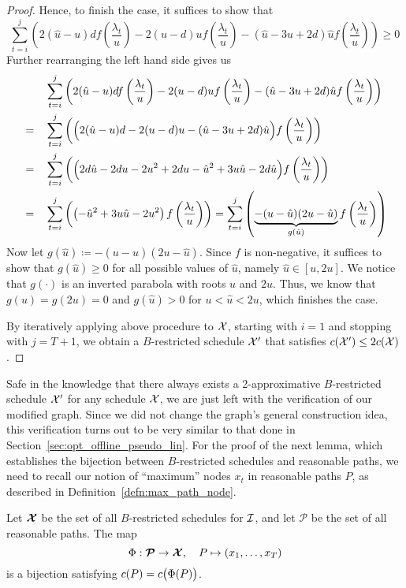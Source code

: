 \begin{proof}
Hence, to finish the case, it suffices to show that
\begin{equation*}
	\sum\limits_{t=i}^j\left(2(\hat{u}-u)df\left(\frac{\lambda_t}{u}\right)-2(u-d)uf\left(\frac{\lambda_t}{u}\right)-(\hat{u}-3u+2d)\hat{u}f\left(\frac{\lambda_t}{u}\right)\right)\ge 0
\end{equation*}
Further rearranging the left hand side gives us
\begin{align*}
	&&&\sum\limits_{t=i}^j\left(2(\hat{u}-u)df\left(\frac{\lambda_t}{u}\right)-2(u-d)uf\left(\frac{\lambda_t}{u}\right)-(\hat{u}-3u+2d)\hat{u}f\left(\frac{\lambda_t}{u}\right)\right)\\
	&=&&\sum\limits_{t=i}^j\left(\Bigl(2(\hat{u}-u)d-2(u-d)u-(\hat{u}-3u+2d)\hat{u}\Bigr)f\left(\frac{\lambda_t}{u}\right)\right)\\
	&=&&\sum\limits_{t=i}^j\left(\Bigl(2d\hat{u}-2du-2u^2+2du-\hat{u}^2+3u\hat{u}-2d\hat{u}\Bigr)f\left(\frac{\lambda_t}{u}\right)\right)\\
	&=&&\sum\limits_{t=i}^j\left(\left(-\hat{u}^2+3u\hat{u}-2u^2\right)f\left(\frac{\lambda_t}{u}\right)\right)=\sum\limits_{t=i}^j\left(\underbrace{-(u-\hat{u})(2u-\hat{u})}_{g(\hat{u})}f\left(\frac{\lambda_t}{u}\right)\right) 
\end{align*}
Now let $g(\hat{u})\coloneqq-(u-\hat{u})(2u-\hat{u})$. Since $f$ is non-negative, it suffices to show that $g(\hat{u})\ge0$ for all possible values of $\hat{u}$, namely $\hat{u}\in[u,2u]$. We notice that $g(\cdot)$ is an inverted parabola with roots $u$ and $2u$. Thus, we know that $g(u)=g(2u)=0$ and $g(\hat{u})>0$ for $u<\hat{u}<2u$, which finishes the case.

By iteratively applying above procedure to $\mathcal{X}$, starting with $i=1$ and stopping with $j=T+1$, we obtain a $B$-restricted schedule $\mathcal{X}'$ that satisfies $c(\mathcal{X}')\le2c(\mathcal{X})$.
\end{proof}
Safe in the knowledge that there always exists a 2-approximative $B$-restricted schedule $\mathcal{X}'$ for any schedule $\mathcal{X}$, we are just left with the verification of our modified graph. Since we did not change the graph's general construction idea, this verification turns out to be very similar to that done in Section~\ref{sec:opt_offline_pseudo_lin}. For the proof of the next lemma, which establishes the bijection between $B$-restricted schedules and reasonable paths, we need to recall our notion of ``maximum'' nodes $x_t$ in reasonable paths $P$, as described in Definition~\ref{defn:max_path_node}.
\begin{lem}\label{lem:sched_reasn_path_approx_2}
Let $\bm{\mathcal{X}}$ be the set of all $B$-restricted schedules for $\mathcal{I}$, and let $\bm{\mathcal{P}}$ be the set of all reasonable paths. The map
\begin{equation*}
	\Phi:\bm{\mathcal{P}}\rightarrow\bm{\mathcal{X}},\quad P\mapsto (x_1,\dotsc,x_T)
\end{equation*}
is a bijection satisfying $c(P)=c\bigl(\Phi(P)\bigr)$.
\end{lem}
